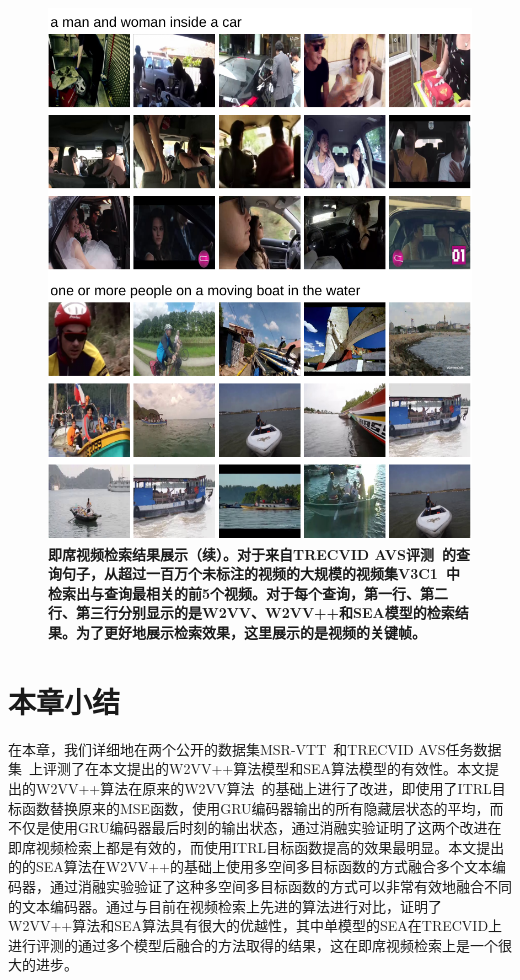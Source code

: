 \begin{figure}[tbh!]
    \centering
    \includegraphics[width=\linewidth]{figures/search_examples2}
    \caption[即席视频检索结果展示（续）]{\textbf{即席视频检索结果展示（续）。对于来自TRECVID AVS评测~\cite{awad2016trecvid,awad2017trecvid,awad2018trecvid,awad2019trecvid}的查询句子，从超过一百万个未标注的视频的大规模的视频集V3C1~\cite{berns2019v3c1}中检索出与查询最相关的前5个视频。对于每个查询，第一行、第二行、第三行分别显示的是W2VV、W2VV++和SEA模型的检索结果。为了更好地展示检索效果，这里展示的是视频的关键帧。}}
    \label{fig:search_examples2}
\end{figure}


\section{本章小结}
在本章，我们详细地在两个公开的数据集MSR-VTT~\cite{msrvtt}和TRECVID AVS任务数据集~\cite{awad2016trecvid}上评测了在本文提出的W2VV++算法模型和SEA算法模型的有效性。本文提出的W2VV++算法在原来的W2VV算法~\cite{dong2018predicting}的基础上进行了改进，即使用了ITRL目标函数替换原来的MSE函数，使用GRU编码器输出的所有隐藏层状态的平均，而不仅是使用GRU编码器最后时刻的输出状态，通过消融实验证明了这两个改进在即席视频检索上都是有效的，而使用ITRL目标函数提高的效果最明显。本文提出的的SEA算法在W2VV++的基础上使用多空间多目标函数的方式融合多个文本编码器，通过消融实验验证了这种多空间多目标函数的方式可以非常有效地融合不同的文本编码器。通过与目前在视频检索上先进的算法进行对比，证明了W2VV++算法和SEA算法具有很大的优越性，其中单模型的SEA在TRECVID上进行评测的通过多个模型后融合的方法取得的结果，这在即席视频检索上是一个很大的进步。

